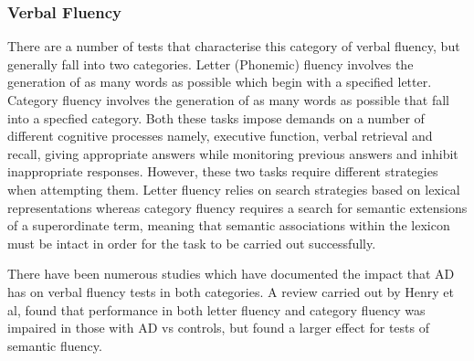 \documentclass{article}
\begin{document}
\subsubsection{Verbal Fluency}
There are a number of tests that characterise this category of verbal fluency, but generally fall into two categories. Letter (Phonemic) fluency involves the generation of as many words as possible which begin with a specified letter. Category fluency involves the generation of as many words as possible that fall into a specfied category. Both these tasks impose demands on a number of different cognitive processes namely, executive function, verbal retrieval and recall, giving appropriate answers while monitoring previous answers and inhibit inappropriate responses. However, these two tasks require different strategies when attempting them. Letter fluency relies on search strategies based on lexical representations whereas category fluency requires a search for semantic extensions of a superordinate term, meaning that semantic associations within the lexicon must be intact in order for the task to be carried out successfully. \par  
There have been numerous studies which have documented the impact that AD has on verbal fluency tests in both categories. A review carried out by Henry et al, found that performance in both letter fluency and category fluency was impaired in those with AD vs controls, but found a larger effect for tests of semantic fluency.
\end{document}
